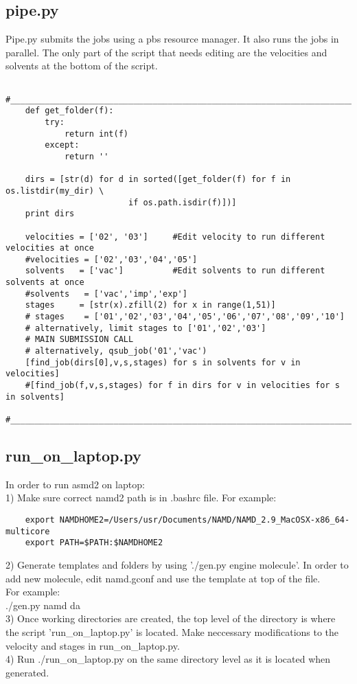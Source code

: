 \documentclass[11pt]{article}
\begin{document}
\subsection{pipe.py}
Pipe.py submits the jobs using a pbs resource manager. It also runs the jobs in parallel. The only part of the script that needs editing are the velocities and solvents at the bottom of the script. 
\begin{verbatim}
    #__________________________________________________________________________
    def get_folder(f):
        try:
            return int(f)
        except:
            return ''

    dirs = [str(d) for d in sorted([get_folder(f) for f in os.listdir(my_dir) \
                         if os.path.isdir(f)])]
    print dirs

    velocities = ['02', '03']     #Edit velocity to run different velocities at once
    #velocities = ['02','03','04','05']
    solvents   = ['vac']          #Edit solvents to run different solvents at once
    #solvents   = ['vac','imp','exp']
    stages     = [str(x).zfill(2) for x in range(1,51)]
    # stages    = ['01','02','03','04','05','06','07','08','09','10']
    # alternatively, limit stages to ['01','02','03']
    # MAIN SUBMISSION CALL
    # alternatively, qsub_job('01','vac')
    [find_job(dirs[0],v,s,stages) for s in solvents for v in velocities]
    #[find_job(f,v,s,stages) for f in dirs for v in velocities for s in solvents]
    #__________________________________________________________________________
\end{verbatim}

\subsection{run\_on\_laptop.py}

In order to run asmd2 on laptop: \\
 1) Make sure correct namd2 path is in .bashrc file.
    For example: \\
    \begin{verbatim}
    export NAMDHOME2=/Users/usr/Documents/NAMD/NAMD_2.9_MacOSX-x86_64-multicore
    export PATH=$PATH:$NAMDHOME2
    \end{verbatim}
 2) Generate templates and folders by using './gen.py engine molecule'.
    In order to add new molecule, edit namd.gconf and use the template at
    top of the file.\\
    For example:\\
    ./gen.py namd da\\
 3) Once working directories are created, the top level of the directory is
    where the script 'run\_on\_laptop.py' is located. Make neccessary modifications
    to the velocity and stages in run\_on\_laptop.py.\\
 4) Run ./run\_on\_laptop.py on the same directory level as it is located when
    generated.\\
\end{document}
